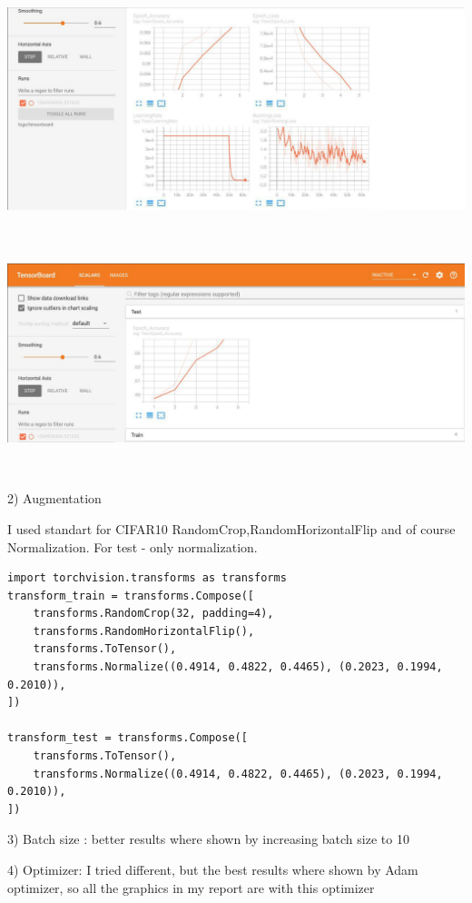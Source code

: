 \documentclass[11pt]{article}
\begin{document}
     \includegraphics[width=\textwidth, height=7cm]{acurtrain}	
      \includegraphics[width=\textwidth, height=7cm]{acurtest}
     
2) Augmentation

I used standart for CIFAR10 RandomCrop,RandomHorizontalFlip and of course Normalization. For test - only normalization.

\begin{lstlisting}
import torchvision.transforms as transforms
transform_train = transforms.Compose([
    transforms.RandomCrop(32, padding=4),
    transforms.RandomHorizontalFlip(),
    transforms.ToTensor(),
    transforms.Normalize((0.4914, 0.4822, 0.4465), (0.2023, 0.1994, 0.2010)),
])

transform_test = transforms.Compose([
    transforms.ToTensor(),
    transforms.Normalize((0.4914, 0.4822, 0.4465), (0.2023, 0.1994, 0.2010)),
])
\end{lstlisting}

3) Batch size : better results where shown by increasing batch size to 10

4) Optimizer: I tried different, but the best results where shown by Adam optimizer, so all the graphics in my report are with this optimizer 
\end{document}
